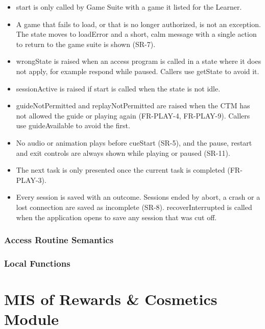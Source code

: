 \documentclass[12pt, titlepage]{article}
\begin{document}
\begin{itemize}
\item start is only called by Game Suite with a game it listed for the Learner.
\item A game that fails to load, or that is no longer authorized, is not an
  exception. The state moves to loadError and a short, calm message with a
  single action to return to the game suite is shown (SR-7).
\item wrongState is raised when an access program is called in a state where it
  does not apply, for example respond while paused. Callers use getState to
  avoid it.
\item sessionActive is raised if start is called when the state is not idle.
\item guideNotPermitted and replayNotPermitted are raised when the CTM has not
  allowed the guide or playing again (FR-PLAY-4, FR-PLAY-9). Callers use
  guideAvailable to avoid the first.
\item No audio or animation plays before cueStart (SR-5), and the pause, restart
  and exit controls are always shown while playing or paused (SR-11).
\item The next task is only presented once the current task is completed
  (FR-PLAY-3).
\item Every session is saved with an outcome. Sessions ended by abort, a crash
  or a lost connection are saved as incomplete (SR-8). recoverInterrupted is
  called when the application opens to save any session that was cut off.
\end{itemize}

\subsubsection{Access Routine Semantics}

\subsubsection{Local Functions}

\newpage

\section{MIS of Rewards \& Cosmetics Module} \label{mis:Rewards}
\end{document}
